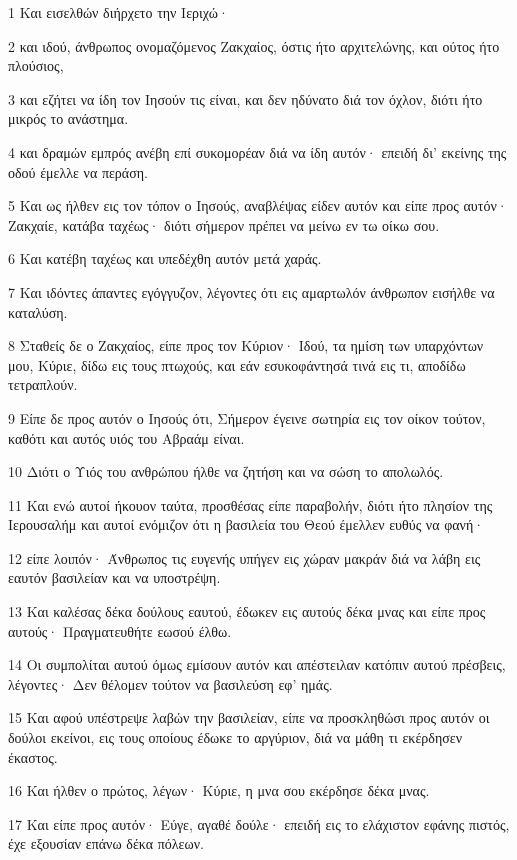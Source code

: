 \par 1 Και εισελθών διήρχετο την Ιεριχώ·
\par 2 και ιδού, άνθρωπος ονομαζόμενος Ζακχαίος, όστις ήτο αρχιτελώνης, και ούτος ήτο πλούσιος,
\par 3 και εζήτει να ίδη τον Ιησούν τις είναι, και δεν ηδύνατο διά τον όχλον, διότι ήτο μικρός το ανάστημα.
\par 4 και δραμών εμπρός ανέβη επί συκομορέαν διά να ίδη αυτόν· επειδή δι' εκείνης της οδού έμελλε να περάση.
\par 5 Και ως ήλθεν εις τον τόπον ο Ιησούς, αναβλέψας είδεν αυτόν και είπε προς αυτόν· Ζακχαίε, κατάβα ταχέως· διότι σήμερον πρέπει να μείνω εν τω οίκω σου.
\par 6 Και κατέβη ταχέως και υπεδέχθη αυτόν μετά χαράς.
\par 7 Και ιδόντες άπαντες εγόγγυζον, λέγοντες ότι εις αμαρτωλόν άνθρωπον εισήλθε να καταλύση.
\par 8 Σταθείς δε ο Ζακχαίος, είπε προς τον Κύριον· Ιδού, τα ημίση των υπαρχόντων μου, Κύριε, δίδω εις τους πτωχούς, και εάν εσυκοφάντησά τινά εις τι, αποδίδω τετραπλούν.
\par 9 Είπε δε προς αυτόν ο Ιησούς ότι, Σήμερον έγεινε σωτηρία εις τον οίκον τούτον, καθότι και αυτός υιός του Αβραάμ είναι.
\par 10 Διότι ο Υιός του ανθρώπου ήλθε να ζητήση και να σώση το απολωλός.
\par 11 Και ενώ αυτοί ήκουον ταύτα, προσθέσας είπε παραβολήν, διότι ήτο πλησίον της Ιερουσαλήμ και αυτοί ενόμιζον ότι η βασιλεία του Θεού έμελλεν ευθύς να φανή·
\par 12 είπε λοιπόν· Άνθρωπος τις ευγενής υπήγεν εις χώραν μακράν διά να λάβη εις εαυτόν βασιλείαν και να υποστρέψη.
\par 13 Και καλέσας δέκα δούλους εαυτού, έδωκεν εις αυτούς δέκα μνας και είπε προς αυτούς· Πραγματευθήτε εωσού έλθω.
\par 14 Οι συμπολίται αυτού όμως εμίσουν αυτόν και απέστειλαν κατόπιν αυτού πρέσβεις, λέγοντες· Δεν θέλομεν τούτον να βασιλεύση εφ' ημάς.
\par 15 Και αφού υπέστρεψε λαβών την βασιλείαν, είπε να προσκληθώσι προς αυτόν οι δούλοι εκείνοι, εις τους οποίους έδωκε το αργύριον, διά να μάθη τι εκέρδησεν έκαστος.
\par 16 Και ήλθεν ο πρώτος, λέγων· Κύριε, η μνα σου εκέρδησε δέκα μνας.
\par 17 Και είπε προς αυτόν· Εύγε, αγαθέ δούλε· επειδή εις το ελάχιστον εφάνης πιστός, έχε εξουσίαν επάνω δέκα πόλεων.
